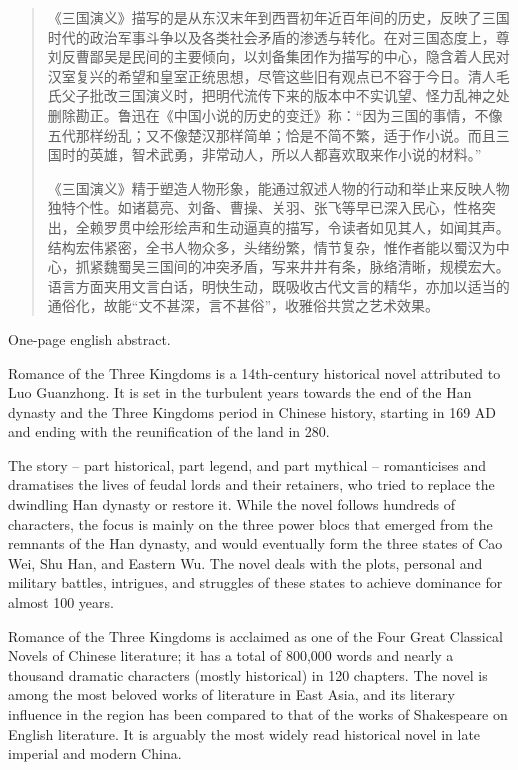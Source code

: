 \begin{abstract}
    \hspace{2em}《三国演义》描写的是从东汉末年到西晋初年近百年间的历史，反映了三国时代的政治军事斗争以及各类社会矛盾的渗透与转化。在对三国态度上，尊刘反曹鄙吴是民间的主要倾向，以刘备集团作为描写的中心，隐含着人民对汉室复兴的希望和皇室正统思想，尽管这些旧有观点已不容于今日。清人毛氏父子批改三国演义时，把明代流传下来的版本中不实讥望、怪力乱神之处删除勘正。鲁迅在《中国小说的历史的变迁》称：“因为三国的事情，不像五代那样纷乱；又不像楚汉那样简单；恰是不简不繁，适于作小说。而且三国时的英雄，智术武勇，非常动人，所以人都喜欢取来作小说的材料。”

    \hspace{2em}《三国演义》精于塑造人物形象，能通过叙述人物的行动和举止来反映人物独特个性。如诸葛亮、刘备、曹操、关羽、张飞等早已深入民心，性格突出，全赖罗贯中绘形绘声和生动逼真的描写，令读者如见其人，如闻其声。结构宏伟紧密，全书人物众多，头绪纷繁，情节复杂，惟作者能以蜀汉为中心，抓紧魏蜀吴三国间的冲突矛盾，写来井井有条，脉络清晰，规模宏大。语言方面夹用文言白话，明快生动，既吸收古代文言的精华，亦加以适当的通俗化，故能“文不甚深，言不甚俗”，收雅俗共赏之艺术效果。
    
\end{abstract}

\begin{englishabstract}

    One-page english abstract.
    
    Romance of the Three Kingdoms is a 14th-century historical novel attributed to Luo Guanzhong. It is set in the turbulent years towards the end of the Han dynasty and the Three Kingdoms period in Chinese history, starting in 169 AD and ending with the reunification of the land in 280.
    
    The story – part historical, part legend, and part mythical – romanticises and dramatises the lives of feudal lords and their retainers, who tried to replace the dwindling Han dynasty or restore it. While the novel follows hundreds of characters, the focus is mainly on the three power blocs that emerged from the remnants of the Han dynasty, and would eventually form the three states of Cao Wei, Shu Han, and Eastern Wu. The novel deals with the plots, personal and military battles, intrigues, and struggles of these states to achieve dominance for almost 100 years.
    
    Romance of the Three Kingdoms is acclaimed as one of the Four Great Classical Novels of Chinese literature; it has a total of 800,000 words and nearly a thousand dramatic characters (mostly historical) in 120 chapters. The novel is among the most beloved works of literature in East Asia, and its literary influence in the region has been compared to that of the works of Shakespeare on English literature. It is arguably the most widely read historical novel in late imperial and modern China.

\end{englishabstract}

